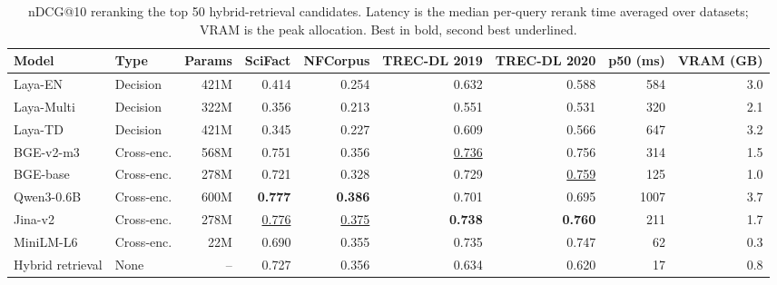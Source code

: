 \begin{table}[t]
\centering
\small
\caption{nDCG@10 reranking the top 50 hybrid-retrieval candidates. Latency is the median per-query rerank time averaged over datasets; VRAM is the peak allocation. Best in bold, second best underlined.}
\label{tab:main}
\begin{tabular}{llrrrrrrr}
\toprule
Model & Type & Params & SciFact & NFCorpus & TREC-DL 2019 & TREC-DL 2020 & p50 (ms) & VRAM (GB) \\
\midrule
Laya-EN & Decision & 421M & 0.414 & 0.254 & 0.632 & 0.588 & 584 & 3.0 \\
Laya-Multi & Decision & 322M & 0.356 & 0.213 & 0.551 & 0.531 & 320 & 2.1 \\
Laya-TD & Decision & 421M & 0.345 & 0.227 & 0.609 & 0.566 & 647 & 3.2 \\
BGE-v2-m3 & Cross-enc. & 568M & 0.751 & 0.356 & \underline{0.736} & 0.756 & 314 & 1.5 \\
BGE-base & Cross-enc. & 278M & 0.721 & 0.328 & 0.729 & \underline{0.759} & 125 & 1.0 \\
Qwen3-0.6B & Cross-enc. & 600M & \textbf{0.777} & \textbf{0.386} & 0.701 & 0.695 & 1007 & 3.7 \\
Jina-v2 & Cross-enc. & 278M & \underline{0.776} & \underline{0.375} & \textbf{0.738} & \textbf{0.760} & 211 & 1.7 \\
MiniLM-L6 & Cross-enc. & 22M & 0.690 & 0.355 & 0.735 & 0.747 & 62 & 0.3 \\
Hybrid retrieval & None & -- & 0.727 & 0.356 & 0.634 & 0.620 & 17 & 0.8 \\
\bottomrule
\end{tabular}
\end{table}
